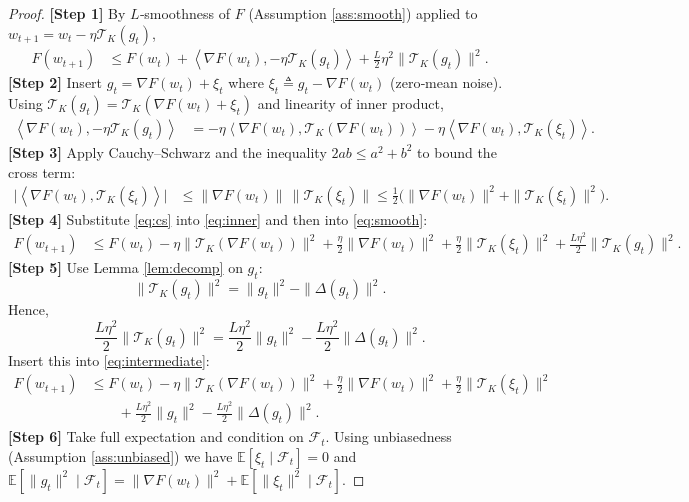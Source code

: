 \documentclass{article}
\newcommand{\E}{\mathbb{E}}
\newcommand{\iprod}[2]{\left\langle #1,#2\right\rangle}
\begin{document}
\begin{proof}
\textbf{[Step 1]}   By $L$‑smoothness of $F$ (Assumption \ref{ass:smooth}) applied to $w_{t+1}=w_t-\eta\mathcal{T}_K(g_t)$,
\begin{align}
F(w_{t+1})
&\le F(w_t)+\iprod{\nabla F(w_t)}{-\eta\mathcal{T}_K(g_t)}+\frac{L}{2}\eta^2\|\mathcal{T}_K(g_t)\|^2. \label{eq:smooth}
\end{align}
\textbf{[Step 2]}   Insert $g_t=\nabla F(w_t)+\xi_t$ where $\xi_t\triangleq g_t-\nabla F(w_t)$ (zero‑mean noise).  Using $\mathcal{T}_K(g_t)=\mathcal{T}_K(\nabla F(w_t)+\xi_t)$ and linearity of inner product,
\begin{align}
\iprod{\nabla F(w_t)}{-\eta\mathcal{T}_K(g_t)}
&= -\eta\iprod{\nabla F(w_t)}{\mathcal{T}_K(\nabla F(w_t))} 
    -\eta\iprod{\nabla F(w_t)}{\mathcal{T}_K(\xi_t)}. \label{eq:inner}
\end{align}
\textbf{[Step 3]}   Apply Cauchy–Schwarz and the inequality $2ab\le a^2+b^2$ to bound the cross term:
\begin{align}
\big|\iprod{\nabla F(w_t)}{\mathcal{T}_K(\xi_t)}\big|
&\le \|\nabla F(w_t)\|\,\|\mathcal{T}_K(\xi_t)\|
\le \frac{1}{2}\big(\|\nabla F(w_t)\|^2+\|\mathcal{T}_K(\xi_t)\|^2\big). \label{eq:cs}
\end{align}
\textbf{[Step 4]}   Substitute \eqref{eq:cs} into \eqref{eq:inner} and then into \eqref{eq:smooth}:
\begin{align}
F(w_{t+1})
&\le F(w_t)-\eta\|\mathcal{T}_K(\nabla F(w_t))\|^2 
   +\frac{\eta}{2}\|\nabla F(w_t)\|^2
   +\frac{\eta}{2}\|\mathcal{T}_K(\xi_t)\|^2
   +\frac{L\eta^2}{2}\|\mathcal{T}_K(g_t)\|^2. \label{eq:intermediate}
\end{align}
\textbf{[Step 5]}   Use Lemma \ref{lem:decomp} on $g_t$:
\[
\|\mathcal{T}_K(g_t)\|^2 = \|g_t\|^2-\|\Delta(g_t)\|^2.
\]
Hence,
\[
\frac{L\eta^2}{2}\|\mathcal{T}_K(g_t)\|^2
= \frac{L\eta^2}{2}\|g_t\|^2-\frac{L\eta^2}{2}\|\Delta(g_t)\|^2.
\]
Insert this into \eqref{eq:intermediate}:
\begin{align}
F(w_{t+1})
&\le F(w_t)-\eta\|\mathcal{T}_K(\nabla F(w_t))\|^2 
   +\frac{\eta}{2}\|\nabla F(w_t)\|^2
   +\frac{\eta}{2}\|\mathcal{T}_K(\xi_t)\|^2 \nonumber\\
&\qquad
   +\frac{L\eta^2}{2}\|g_t\|^2
   -\frac{L\eta^2}{2}\|\Delta(g_t)\|^2. \label{eq:before_exp}
\end{align}
\textbf{[Step 6]}   Take full expectation and condition on $\mathcal{F}_t$.
Using unbiasedness (Assumption \ref{ass:unbiased}) we have $\E[\xi_t\mid\mathcal{F}_t]=0$ and $\E[\|g_t\|^2\mid\mathcal{F}_t]=\|\nabla F(w_t)\|^2+\E[\|\xi_t\|^2\mid\mathcal{F}_t]$.

\end{proof}
\end{document}
